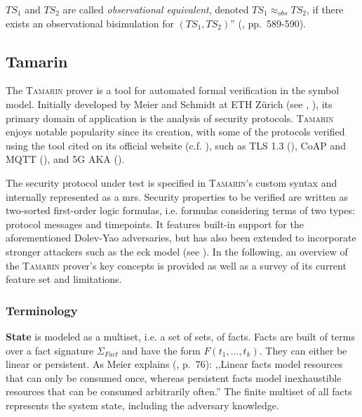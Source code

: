 \noindent
$TS_1$ and $TS_2$ are called \textit{observational equivalent}, denoted $TS_1 \approx_{obs} TS_2$, if there exists an observational bisimulation for $(TS_1, TS_2)$'' (\cite{baier2008principles}, pp.~589-590).

\subsection{Tamarin}
\label{ssec:tamarin}

The \textsc{Tamarin} prover is a tool for automated formal verification in the symbol model.
Initially developed by Meier and Schmidt at ETH Zürich (see \cite{schmidt2012formal}, \cite{meier2013advancing}), its primary domain of application is the analysis of security protocols.
\textsc{Tamarin} enjoys notable popularity since its creation, with some of the protocols verified using the tool cited on its official website (c.f. \cite{tamarin}), such as TLS 1.3 (\cite{cremers2017comprehensive}), CoAP and MQTT (\cite{kim2017automated}), and 5G AKA (\cite{basin2018formal}).

The security protocol under test is specified in \textsc{Tamarin}'s custom syntax and internally represented as a \gls{mrs}.
Security properties to be verified are written as two-sorted first-order logic formulas, i.e. formulas considering terms of two types: protocol messages and timepoints.
It features built-in support for the aforementioned Dolev-Yao adversaries, but has also been extended to incorporate stronger attackers such as the \gls{eck} model (see \cite{lamacchia2007stronger}).
In the following, an overview of the \textsc{Tamarin} prover's key concepts is provided as well as a survey of its current feature set and limitations.

\subsubsection{Terminology}

\textbf{State} is modeled as a multiset, i.e. a set of sets, of facts.
Facts are built of terms over a fact signature $\Sigma_{Fact}$ and have the form $F(t_1, \ldots, t_k)$.
They can either be linear or persistent.
As Meier explains (\cite{meier2013advancing}, p.~76): ,,Linear facts model resources that can only be consumed once, whereas persistent facts model inexhaustible resources that can be consumed arbitrarily often.''
The finite multiset of all facts represents the system state, including the adversary knowledge.

